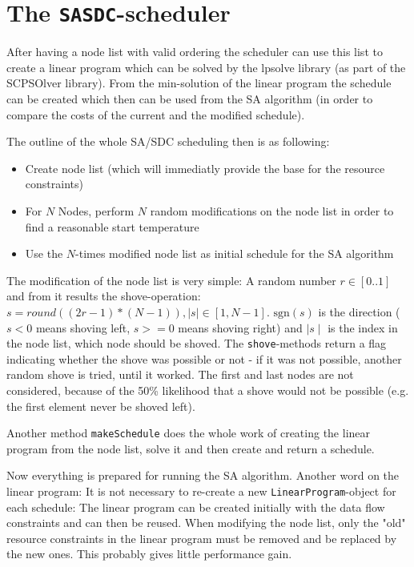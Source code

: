\documentclass[colorback,accentcolor=tud1c,11pt]{tudreport}
\newcommand\code[1]{\texttt{#1}}
\begin{document}
\section{The \code{SASDC}-scheduler}
After having a node list with valid ordering the scheduler can use this list to create a linear program which can be solved by the lpsolve library (as part of the SCPSOlver library). From the min-solution of the linear program the schedule can be created which then can be used from the SA algorithm (in order to compare the costs of the current and the modified schedule).\par
The outline of the whole SA/SDC scheduling then is as following:
\begin{itemize}
	\item{Create node list (which will immediatly provide the base for the resource constraints)}
	\item{For $N$ Nodes, perform $N$ random modifications on the node list in order to find a reasonable start temperature}
	\item{Use the $N$-times modified node list as initial schedule for the SA algorithm}
\end{itemize}

The modification of the node list is very simple: A random number $r \in [0..1]$ and from it results the shove-operation: $s = round((2r-1)*(N-1)), \mid s \mid \in [1, N-1]$. $\text{sgn}(s)$ is the direction ($s<0$ means shoving left, $s>=0$ means shoving right) and $\mid s \mid$ is the index in the node list, which node should be shoved. The \code{shove}-methods return a flag indicating whether the shove was possible or not - if it was not possible, another random shove is tried, until it worked. The first and last nodes are not considered, because of the 50\% likelihood that a shove would not be possible (e.g. the first element never be shoved left).\par
Another method \code{makeSchedule} does the whole work of creating the linear program from the node list, solve it and then create and return a schedule.\par
Now everything is prepared for running the SA algorithm. Another word on the linear program: It is not necessary to re-create a new \code{LinearProgram}-object for each schedule: The linear program can be created initially with the data flow constraints and can then be reused. When modifying the node list, only the "old" resource constraints in the linear program must be removed and be replaced by the new ones. This probably gives little performance gain.
\end{document}
